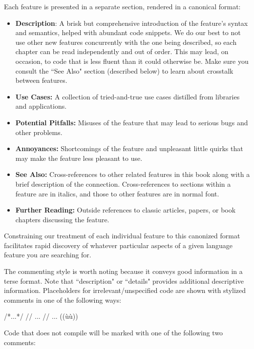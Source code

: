 Each feature is presented in a separate section, rendered in a canonical format:
\begin{itemize}
\item{\textbf{Description}: A brisk but comprehensive introduction of the feature's syntax and semantics, helped with abundant code snippets. We do our best to not use other new features concurrently with the one being described, so each chapter can be read independently and out of order. This may lead, on occasion, to code that is less fluent than it could otherwise be. Make sure you consult the ``See Also" section (described below) to learn about crosstalk between features.}
\item{\textbf{Use Cases:} A collection of tried-and-true use cases distilled from libraries and\linebreak%
 \mbox{applications}.}
\item{\textbf{Potential Pitfalls:} Misuses of the feature that may lead to serious bugs and other problems.}
\item{\textbf{Annoyances:} Shortcomings of the feature and unpleasant little quirks that may make the feature less pleasant to use.}
\item{\textbf{See Also:} Cross-references to other related features in this book along with a brief description of the connection. Cross-references to sections
within a feature are in italics, and those to other features are in normal font.}
\item{\textbf{Further Reading:} Outside references to classic articles, papers, or book chapters discussing the feature.}
\end{itemize}%
Constraining our treatment of each individual feature to this canonized format facilitates rapid discovery of whatever particular aspects of a given language feature you are searching for.

The commenting style is worth noting because it conveys good information in a terse format. Note that ``description" or ``details" provides additional descriptive information. Placeholders for irrelevant/unspecified code are shown with stylized comments in one of the following ways:

\begin{emcppslisting}
/*...*/
// ...
// ...                              ((ù{}ù))
\end{emcppslisting}

\noindent Code that does not compile will be marked with one of the following two comments:

